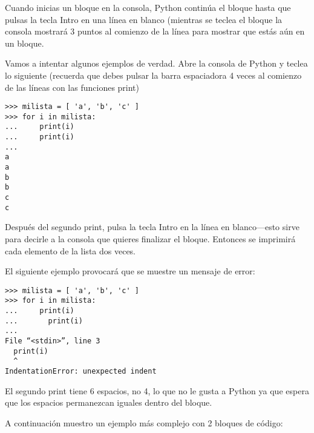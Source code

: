 Cuando inicias un bloque en la consola, Python continúa el bloque hasta que pulsas la tecla Intro en una línea en blanco (mientras se teclea el bloque la consola mostrará 3 puntos al comienzo de la línea para mostrar que estás aún en un bloque.

Vamos a intentar algunos ejemplos de verdad.  Abre la consola de Python y teclea  lo siguiente (recuerda que debes pulsar la barra espaciadora 4 veces al comienzo de las líneas con las funciones print)

\begin{listing}
\begin{verbatim}
>>> milista = [ 'a', 'b', 'c' ]
>>> for i in milista:
...     print(i)
...     print(i)
...
a
a
b
b
c
c
\end{verbatim}
\end{listing}

Después del segundo print, pulsa la tecla Intro en la línea en blanco---esto sirve para decirle a la consola que quieres finalizar el bloque. Entonces se imprimirá cada elemento de la lista dos veces.
\par
\noindent
El siguiente ejemplo provocará que se muestre un mensaje de error:

\begin{listing}
\begin{verbatim}
>>> milista = [ 'a', 'b', 'c' ]
>>> for i in milista:
...     print(i)
...       print(i)
...
File “<stdin>”, line 3
  print(i)
  ^
IndentationError: unexpected indent
\end{verbatim}
\end{listing}

El segundo print tiene 6 espacios, no 4, lo que no le gusta a Python ya que espera que los espacios permanezcan iguales dentro del bloque.


\par
A continuación muestro un ejemplo más complejo con 2 bloques de código:

